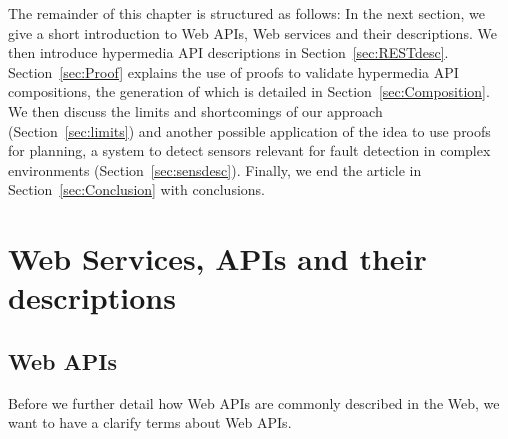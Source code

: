 The remainder of this chapter is structured as follows: %
% 
In the next section, we give a short introduction to Web APIs, Web services and their descriptions. %
We then introduce hypermedia API descriptions in Section~\ref{sec:RESTdesc}.
Section~\ref{sec:Proof} explains the use of proofs
to validate hypermedia API compositions,
the generation of which is detailed in Section~\ref{sec:Composition}.
We then discuss the limits and shortcomings of our approach (Section~\ref{sec:limits}) and another possible application of the idea to use proofs for planning, a system to detect 
sensors relevant for fault detection in complex environments (Section~\ref{sec:sensdesc}).
Finally, we end the article in Section~\ref{sec:Conclusion} with conclusions.

\section{Web Services, APIs and their descriptions}

\subsection{Web APIs}
Before we further detail how Web APIs are commonly described in the Web, we want to have a clarify terms about Web APIs.

